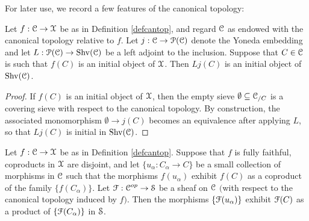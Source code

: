 For later use, we record a few features of the canonical topology:

\begin{lemma}\label{caninit}
Let $f: \operatorname{\mathcal{C}} \rightarrow \operatorname{\mathcal{X}}$ be as in Definition \ref{defcantop}, and regard
$\operatorname{\mathcal{C}}$ as endowed with the canonical topology relative to $f$. Let $j: \operatorname{\mathcal{C}} \rightarrow \operatorname{\mathcal{P}}(\operatorname{\mathcal{C}})$ denote the Yoneda embedding and let $L: \operatorname{\mathcal{P}}(\operatorname{\mathcal{C}}) \rightarrow \operatorname{Shv}(\operatorname{\mathcal{C}})$
be a left adjoint to the inclusion. Suppose that $C \in \operatorname{\mathcal{C}}$ is such that $f(C)$ is an initial object of $\operatorname{\mathcal{X}}$. Then $L j(C)$ is an initial object of $\operatorname{Shv}(\operatorname{\mathcal{C}})$.
\end{lemma}

\begin{proof}
If $f(C)$ is an initial object of $\operatorname{\mathcal{X}}$, then the empty sieve $\emptyset \subseteq \operatorname{\mathcal{C}}_{/C}$
is a covering sieve with respect to the canonical topology. By construction, the associated monomorphism $\emptyset \rightarrow j(C)$ becomes an equivalence after applying $L$, so that $L j(C)$ is initial in $\operatorname{Shv}(\operatorname{\mathcal{C}})$.
\end{proof}

\begin{lemma}\label{canonicalcoproducts}
Let $f: \operatorname{\mathcal{C}} \rightarrow \operatorname{\mathcal{X}}$ be as in Definition \ref{defcantop}. Suppose that $f$ is fully faithful, coproducts in $\operatorname{\mathcal{X}}$ are disjoint, and let $\{ u_{\alpha}: C_{\alpha} \rightarrow C \}$ be a small collection of morphisms in $\operatorname{\mathcal{C}}$ such that the morphisms $f(u_{\alpha})$ exhibit
$f(C)$ as a coproduct of the family $\{ f(C_{\alpha}) \}$. Let $\operatorname{\mathcal{F}}: \operatorname{\mathcal{C}}^{op} \rightarrow \operatorname{\mathcal{S}}$
be a sheaf on $\operatorname{\mathcal{C}}$ $($with respect to the canonical topology induced by $f${}$)$. Then the morphisms
$\{ \operatorname{\mathcal{F}}(u_{\alpha}) \}$ exhibit $\operatorname{\mathcal{F}}(C)$ as a product of $\{ \operatorname{\mathcal{F}}(C_{\alpha}) \}$ in $\operatorname{\mathcal{S}}$.
\end{lemma}

